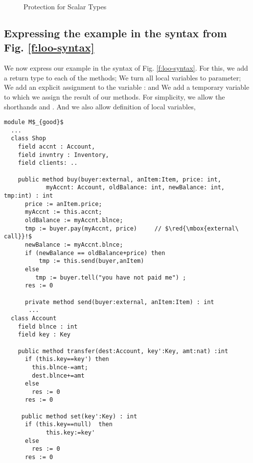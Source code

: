 \begin{figure}[htb]
\caption{Protection for Scalar Types}
\label{f:protection:conseq:ext}
\end{figure}




\subsection{Expressing the  example in the syntax from Fig. \ref{f:loo-syntax}}
\label{s:app:syntax:transform}

{
We now express our example in the syntax of Fig. \ref{f:loo-syntax}. 
For this, we  add a return type to each of the methods; 
We turn all local variables to parameter; We add an explicit assignment to the variable : and We   add a temporary variable  to which we assign the result of our  methods.
For simplicity, we allow %
the shorthands \prg{+=} and \prg{-=}.
And we also allow definition of local variables, \eg  {} }

\begin{lstlisting}[mathescape=true, language=Chainmail, frame=lines]
module M$_{good}$
  ...   
  class Shop
    field accnt : Account, 
    field invntry : Inventory, 
    field clients: ..
  
    public method buy(buyer:external, anItem:Item, price: int, 
            myAccnt: Account, oldBalance: int, newBalance: int, tmp:int) : int
      price := anItem.price;
      myAccnt := this.accnt;
      oldBalance := myAccnt.blnce;
      tmp := buyer.pay(myAccnt, price)     // $\red{\mbox{external\ call}}!$
      newBalance := myAccnt.blnce;
      if (newBalance == oldBalance+price) then
          tmp := this.send(buyer,anItem)
      else
         tmp := buyer.tell("you have not paid me") ; 
      res := 0
     
      private method send(buyer:external, anItem:Item) : int
       ... 
  class Account
    field blnce : int 
    field key : Key
    
    public method transfer(dest:Account, key':Key, amt:nat) :int
      if (this.key==key') then
        this.blnce-=amt;
        dest.blnce+=amt
      else
        res := 0
      res := 0
	  
     public method set(key':Key) : int
      if (this.key==null)  then
      		this.key:=key'
      else 
        res := 0
      res := 0
\end{lstlisting}

